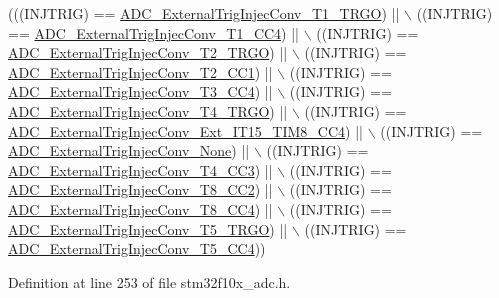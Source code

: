 \begin{DoxyCode}
(((INJTRIG) == \hyperlink{group___a_d_c__external__trigger__sources__for__injected__channels__conversion_gabf47f66e60c166f6b63b805f72ad94b0}{ADC\_ExternalTrigInjecConv\_T1\_TRGO}) || \(\backslash\)
                                        ((INJTRIG) == 
      \hyperlink{group___a_d_c__external__trigger__sources__for__injected__channels__conversion_gabd27bcc6ff5af6713a124b3801759bcf}{ADC\_ExternalTrigInjecConv\_T1\_CC4}) || \(\backslash\)
                                        ((INJTRIG) == 
      \hyperlink{group___a_d_c__external__trigger__sources__for__injected__channels__conversion_gaaad112b2b035dfd77c9743197c51b16f}{ADC\_ExternalTrigInjecConv\_T2\_TRGO}) || \(\backslash\)
                                        ((INJTRIG) == 
      \hyperlink{group___a_d_c__external__trigger__sources__for__injected__channels__conversion_ga49089501c5bf2a2c22019fbca4b688e9}{ADC\_ExternalTrigInjecConv\_T2\_CC1}) || \(\backslash\)
                                        ((INJTRIG) == 
      \hyperlink{group___a_d_c__external__trigger__sources__for__injected__channels__conversion_ga6c9ddf9bba0cefe77dbcd601aed24f7b}{ADC\_ExternalTrigInjecConv\_T3\_CC4}) || \(\backslash\)
                                        ((INJTRIG) == 
      \hyperlink{group___a_d_c__external__trigger__sources__for__injected__channels__conversion_gab12e5503085cdb9dde4a59614e421284}{ADC\_ExternalTrigInjecConv\_T4\_TRGO}) || \(\backslash\)
                                        ((INJTRIG) == 
      \hyperlink{group___a_d_c__external__trigger__sources__for__injected__channels__conversion_gaa23965b742e08142e5d1c453166dbcc2}{ADC\_ExternalTrigInjecConv\_Ext\_IT15\_TIM8\_CC4}) || \(\backslash\)
                                        ((INJTRIG) == 
      \hyperlink{group___a_d_c__external__trigger__sources__for__injected__channels__conversion_gaad11a68fca76d97b97dc2554dac5cb16}{ADC\_ExternalTrigInjecConv\_None}) || \(\backslash\)
                                        ((INJTRIG) == 
      \hyperlink{group___a_d_c__external__trigger__sources__for__injected__channels__conversion_gae342ca48595f0b2bf866943969026581}{ADC\_ExternalTrigInjecConv\_T4\_CC3}) || \(\backslash\)
                                        ((INJTRIG) == 
      \hyperlink{group___a_d_c__external__trigger__sources__for__injected__channels__conversion_gac0320df9aa5e2d378b05f8e4dcc1616a}{ADC\_ExternalTrigInjecConv\_T8\_CC2}) || \(\backslash\)
                                        ((INJTRIG) == 
      \hyperlink{group___a_d_c__external__trigger__sources__for__injected__channels__conversion_ga6724679fe75f87c029f268ef47841a3e}{ADC\_ExternalTrigInjecConv\_T8\_CC4}) || \(\backslash\)
                                        ((INJTRIG) == 
      \hyperlink{group___a_d_c__external__trigger__sources__for__injected__channels__conversion_ga1d92236e9eb9f3adf69371f3f698192e}{ADC\_ExternalTrigInjecConv\_T5\_TRGO}) || \(\backslash\)
                                        ((INJTRIG) == 
      \hyperlink{group___a_d_c__external__trigger__sources__for__injected__channels__conversion_gade68a960ba05714e5f0a1f11a086884e}{ADC\_ExternalTrigInjecConv\_T5\_CC4}))
\end{DoxyCode}


Definition at line 253 of file stm32f10x\+\_\+adc.\+h.

